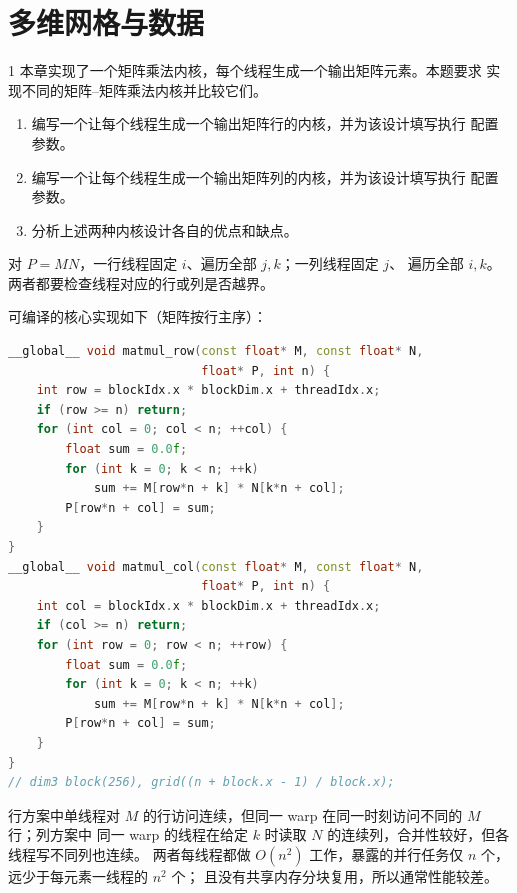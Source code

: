 \chapter{多维网格与数据}

\begin{solutionexercise}{1}
\problemheading 本章实现了一个矩阵乘法内核，每个线程生成一个输出矩阵元素。本题要求
实现不同的矩阵--矩阵乘法内核并比较它们。
\begin{enumerate}[label=\alph*.,leftmargin=2.2em]
  \item 编写一个让每个线程生成一个输出矩阵行的内核，并为该设计填写执行
  配置参数。
  \item 编写一个让每个线程生成一个输出矩阵列的内核，并为该设计填写执行
  配置参数。
  \item 分析上述两种内核设计各自的优点和缺点。
\end{enumerate}

\approachheading 对 $P=MN$，一行线程固定 $i$、遍历全部 $j,k$；一列线程固定 $j$、
遍历全部 $i,k$。两者都要检查线程对应的行或列是否越界。

\answerheading 可编译的核心实现如下（矩阵按行主序）：
\begin{lstlisting}[language=C++]
__global__ void matmul_row(const float* M, const float* N,
                           float* P, int n) {
    int row = blockIdx.x * blockDim.x + threadIdx.x;
    if (row >= n) return;
    for (int col = 0; col < n; ++col) {
        float sum = 0.0f;
        for (int k = 0; k < n; ++k)
            sum += M[row*n + k] * N[k*n + col];
        P[row*n + col] = sum;
    }
}
__global__ void matmul_col(const float* M, const float* N,
                           float* P, int n) {
    int col = blockIdx.x * blockDim.x + threadIdx.x;
    if (col >= n) return;
    for (int row = 0; row < n; ++row) {
        float sum = 0.0f;
        for (int k = 0; k < n; ++k)
            sum += M[row*n + k] * N[k*n + col];
        P[row*n + col] = sum;
    }
}
// dim3 block(256), grid((n + block.x - 1) / block.x);
\end{lstlisting}
行方案中单线程对 $M$ 的行访问连续，但同一 warp 在同一时刻访问不同的 $M$ 行；列方案中
同一 warp 的线程在给定 $k$ 时读取 $N$ 的连续列，合并性较好，但各线程写不同列也连续。
两者每线程都做 $O(n^2)$ 工作，暴露的并行任务仅 $n$ 个，远少于每元素一线程的 $n^2$ 个；
且没有共享内存分块复用，所以通常性能较差。


\end{solutionexercise}

